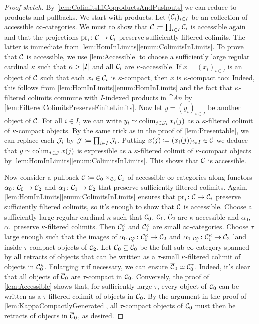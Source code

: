 \begin{proof}[Proof sketch]
	By \cref{lem:ColimitsIffCoproductsAndPushouts} we can reduce to products and pullbacks. We start with products. Let $(\mathcal{C}_i)_{i\in I}$ be an collection of accessible $\infty$-categories. We must to show that $\mathcal{C}\coloneqq \prod_{i\in I}\mathcal{C}_i$ is accessible again and that the projections $\operatorname{pr}_i\colon \mathcal{C}\rightarrow \mathcal{C}_i$ preserve sufficiently filtered colimits. The latter is immediate from \cref{lem:HomInLimits}\cref{enum:ColimitsInLimits}. To prove that $\mathcal{C}$ is accessible, we use \cref{lem:Accessible} to choose a sufficiently large regular cardinal $\kappa$ such that $\kappa >\abs*{I}$ and all $\mathcal{C}_i$ are $\kappa$-accessible. If $x=(x_i)_{i\in I}$ is an object of $\mathcal{C}$ such that each $x_i\in \mathcal{C}_i$ is $\kappa$-compact, then $x$ is $\kappa$-compact too: Indeed, this follows from \cref{lem:HomInLimits}\cref{enum:HomInLimits} and the fact that $\kappa$-filtered colimits commute with $I$-indexed products in $\cat{An}$ by \cref{lem:FilteredColimitsPreserveFiniteLimits}. Now let $y=(y_i)_{i\in I}$ be another object of $\mathcal{C}$. For all $i\in I$, we can write $y_i\simeq \operatorname*{colim}_{j\in\mathcal{J}_i}x_{i}(j)$ as a $\kappa$-filtered colimit of $\kappa$-compact objects. By the same trick as in the proof of \cref{lem:Presentable}, we can replace each $\mathcal{J}_i$ by $\mathcal{J}\coloneqq \prod_{i\in I}\mathcal{J}_i$. Putting $x(j)\coloneqq (x_i(j))_{i\in I}\in\mathcal{C}$ we deduce that $y\simeq \operatorname*{colim}_{j\in \mathcal{J}}x(j)$ is expressible as a $\kappa$-filtered colimit of $\kappa$-compact objects by \cref{lem:HomInLimits}\cref{enum:ColimitsInLimits}. This shows that $\mathcal{C}$ is accessible.
	
	Now consider a pullback $\mathcal{C}\coloneqq \mathcal{C}_0\times_{\mathcal{C}_2}\mathcal{C}_1$ of accessible $\infty$-categories along functors $\alpha_0\colon \mathcal{C}_0\rightarrow \mathcal{C}_2$ and $\alpha_1\colon \mathcal{C}_1\rightarrow \mathcal{C}_2$ that preserve sufficiently filtered colimits. Again, \cref{lem:HomInLimits}\cref{enum:ColimitsInLimits} ensures that $\operatorname{pr}_i\colon \mathcal{C}\rightarrow \mathcal{C}_i$ preserve sufficiently filtered colimits, so it's enough to show that $\mathcal{C}$ is accessible. Choose a sufficiently large regular cardinal $\kappa$ such that $\mathcal{C}_0$, $\mathcal{C}_1$, $\mathcal{C}_2$ are $\kappa$-accessible and $\alpha_0$, $\alpha_1$ preserve $\kappa$-filtered colimits. Then $\mathcal{C}_0^\kappa$ and $\mathcal{C}_1^\kappa$ are small $\infty$-categories. Choose $\tau$ large enough such that the images of $\alpha_0|_{\mathcal{C}_0^\kappa}\colon \mathcal{C}_0^\kappa\rightarrow \mathcal{C}_2$ and $\alpha_1|_{\mathcal{C}_1^\kappa}\colon \mathcal{C}_1^\kappa\rightarrow \mathcal{C}_2$ land inside $\tau$-compact objects of $\mathcal{C}_2$. Let $\ov\Cc_0\subseteq \Cc_0$ be the full sub-$\infty$-category spanned by all retracts of objects that can be written as a $\tau$-small $\kappa$-filtered colimit of objects in $\mathcal{C}_0^\kappa$. Enlarging $\tau$ if necessary, we can ensure $\ov\Cc_0\simeq \Cc_0^\tau$. Indeed, it's clear that all objects of $\ov\Cc_0$ are $\tau$-compact in $\mathcal{C}_0$. Conversely, the proof of \cref{lem:Accessible} shows that, for sufficiently large $\tau$, every object of $\mathcal{C}_0$ can be written as a $\tau$-filtered colimit of objects in $\ov\Cc_0$. By the argument in the proof of \cref{lem:KappaCompactlyGenerated}, all $\tau$-compact objects of $\mathcal{C}_0$ must then be retracts of objects in $\ov\Cc_0$, as desired.
	

\end{proof}
